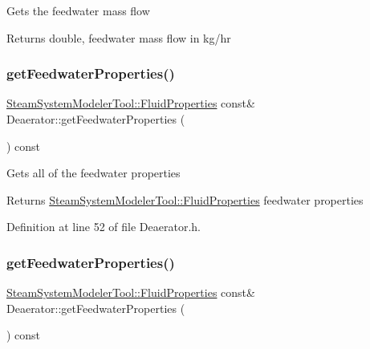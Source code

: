 Gets the feedwater mass flow \begin{DoxyReturn}{Returns}
double, feedwater mass flow in kg/hr 
\end{DoxyReturn}
\mbox{\label{class_deaerator_ab2ab900e36c86e48ad92c4013c471d6b}} 
\subsubsection{\texorpdfstring{get\+Feedwater\+Properties()}{getFeedwaterProperties()}\hspace{0.1cm}{\footnotesize\ttfamily [1/3]}}
{\footnotesize\ttfamily \hyperlink{struct_steam_system_modeler_tool_1_1_fluid_properties}{Steam\+System\+Modeler\+Tool\+::\+Fluid\+Properties} const\& Deaerator\+::get\+Feedwater\+Properties (\begin{DoxyParamCaption}{ }\end{DoxyParamCaption}) const\hspace{0.3cm}{\ttfamily [inline]}}

Gets all of the feedwater properties \begin{DoxyReturn}{Returns}
\hyperlink{struct_steam_system_modeler_tool_1_1_fluid_properties}{Steam\+System\+Modeler\+Tool\+::\+Fluid\+Properties} feedwater properties 
\end{DoxyReturn}


Definition at line 52 of file Deaerator.\+h.

\mbox{\label{class_deaerator_ab2ab900e36c86e48ad92c4013c471d6b}} 
\subsubsection{\texorpdfstring{get\+Feedwater\+Properties()}{getFeedwaterProperties()}\hspace{0.1cm}{\footnotesize\ttfamily [2/3]}}
{\footnotesize\ttfamily \hyperlink{struct_steam_system_modeler_tool_1_1_fluid_properties}{Steam\+System\+Modeler\+Tool\+::\+Fluid\+Properties} const\& Deaerator\+::get\+Feedwater\+Properties (\begin{DoxyParamCaption}{ }\end{DoxyParamCaption}) const\hspace{0.3cm}{\ttfamily [inline]}}

